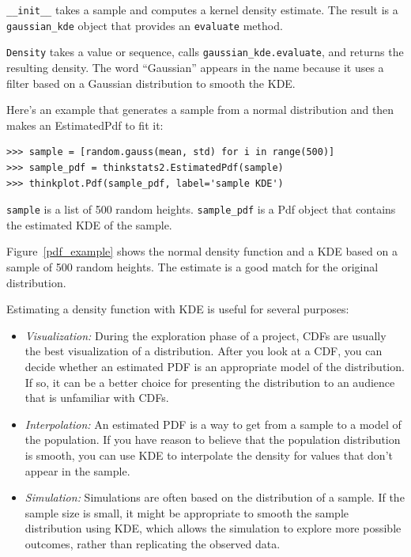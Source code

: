 \documentclass[12pt]{book}
\begin{document}
\verb"__init__" takes a sample
and computes a kernel density estimate.  The result is a
\verb"gaussian_kde" object that provides an {\tt evaluate}
method.

{\tt Density} takes a value or sequence, calls
\verb"gaussian_kde.evaluate", and returns the resulting density.  The
word ``Gaussian'' appears in the name because it uses a filter based
on a Gaussian distribution to smooth the KDE.  

Here's an example that generates a sample from a normal
distribution and then makes an EstimatedPdf to fit it:

\begin{verbatim}
>>> sample = [random.gauss(mean, std) for i in range(500)]
>>> sample_pdf = thinkstats2.EstimatedPdf(sample)
>>> thinkplot.Pdf(sample_pdf, label='sample KDE')
\end{verbatim}

\verb"sample" is a list of 500 random heights.
\verb"sample_pdf" is a Pdf object that contains the estimated
KDE of the sample.

Figure~\ref{pdf_example} shows the normal density function and a KDE
based on a sample of 500 random heights.  The estimate is a good
match for the original distribution.

Estimating a density function with KDE is useful for several purposes:

\begin{itemize}

\item {\it Visualization:} During the exploration phase of a project, CDFs
  are usually the best visualization of a distribution.  After you
  look at a CDF, you can decide whether an estimated PDF is an
  appropriate model of the distribution.  If so, it can be a better
  choice for presenting the distribution to an audience that is
  unfamiliar with CDFs.

\item {\it Interpolation:} An estimated PDF is a way to get from a sample
  to a model of the population.  If you have reason to believe that
  the population distribution is smooth, you can use KDE to interpolate
  the density for values that don't appear in the sample.

\item {\it Simulation:} Simulations are often based on the distribution
  of a sample.  If the sample size is small, it
  might be appropriate to smooth the sample distribution using KDE,
  which allows the simulation to explore more possible outcomes,
  rather than replicating the observed data.

\end{itemize}
\end{document}
